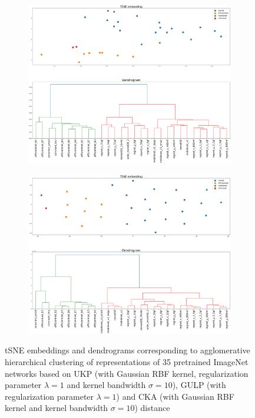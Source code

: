 \documentclass[11pt]{article}
\newcommand{\metricstname}{UKP }
\theoremstyle{plain}
\begin{document}
\begin{figure}[!h]
    \begin{subfigure}[b]{0.45\textwidth}
        \includegraphics[width=\textwidth]{Appendix figures/imagenet_experiments/Additional comparisons for UKP with GULP and CKA/DendogramandTSNE for GULP_dist_1.000000e+00.png}
    \end{subfigure}
    \hfill
    \begin{subfigure}[b]{0.45\textwidth}
        \includegraphics[width=\textwidth]{Appendix figures/imagenet_experiments/Additional comparisons for UKP with GULP and CKA/DendogramandTSNE for CKA_dist_RBF_1.000000e+01.png}
    \end{subfigure}

     \caption{tSNE embeddings and dendrograms corresponding to agglomerative hierarchical clustering of representations of 35 pretrained ImageNet networks based on \metricstname (with Gaussian RBF kernel, regularization parameter $\lambda=1$ and kernel bandwidth $\sigma=10$), GULP (with regularization parameter $\lambda=1$) and CKA (with Gaussian RBF kernel and kernel bandwidth $\sigma=10$) distance}
    \label{ImageNet dendrograms additional}
\end{figure}
\end{document}
